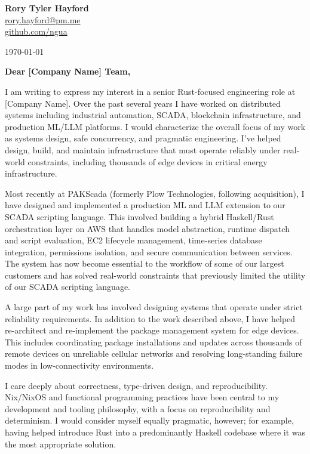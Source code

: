 \documentclass[10.5pt]{article}
\begin{document}
\textbf{Rory Tyler Hayford} \\
\href{mailto:rory.hayford@pm.me}{rory.hayford@pm.me} \\
\href{https://github.com/ngua}{github.com/ngua}

\begin{flushright}
\today
\end{flushright}

\vspace{12pt}

\vspace{12pt}

\textbf{Dear [Company Name] Team,}

I am writing to express my interest in a senior Rust-focused engineering role at [Company Name]. Over the past several years I have worked on distributed systems including industrial automation, SCADA, blockchain infrastructure, and production ML/LLM platforms. I would characterize the overall focus of my work as systems design, safe concurrency, and pragmatic engineering. I've helped design, build, and maintain infrastructure that must operate reliably under real-world constraints, including thousands of edge devices in critical energy infrastructure.

Most recently at PAKScada (formerly Plow Technologies, following acquisition), I have designed and implemented a production ML and LLM extension to our SCADA scripting language. This involved building a hybrid Haskell/Rust orchestration layer on AWS that handles model abstraction, runtime dispatch and script evaluation, EC2 lifecycle management, time-series database integration, permissions isolation, and secure communication between services. The system has now become essential to the workflow of some of our largest customers and has solved real-world constraints that previously limited the utility of our SCADA scripting language.

A large part of my work has involved designing systems that operate under strict reliability requirements. In addition to the work described above, I have helped re-architect and re-implement the package management system for edge devices. This includes coordinating package installations and updates across thousands of remote devices on unreliable cellular networks and resolving long-standing failure modes in low-connectivity environments.

I care deeply about correctness, type-driven design, and reproducibility. Nix/NixOS and functional programming practices have been central to my development and tooling philosophy, with a focus on reproducibility and determinism. I would consider myself equally pragmatic, however; for example, having helped introduce Rust into a predominantly Haskell codebase where it was the most appropriate solution.
\end{document}
